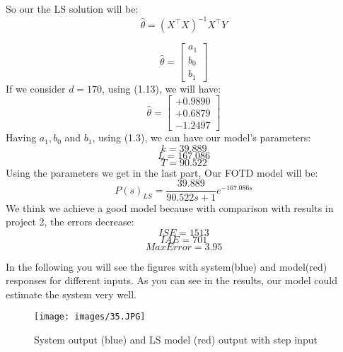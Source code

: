\documentclass[11pt]{scrartcl} %
\begin{document}
So our the LS solution will be:
\begin{equation}\hat{\theta}=\left(X^{\top} X\right)^{-1} X^{\top} Y\end{equation}


\begin{equation}
\hat{\theta}=\left[\begin{array}{l}
a_{1} \\
b_{0} \\
b_{1}
\end{array}\right]
\end{equation}
If we consider $d = 170$, using (1.13), we will have:
\begin{equation}
\hat{\theta}=\left[\begin{array}{l}
+0.9890 \\
+0.6879 \\
-1.2497
\end{array}\right]
\end{equation}
Having $a_1, b_0$ and $b_1$, using (1.3), we can have our model's parameters:
\begin{equation}k=39.889\end{equation}
\begin{equation}L=167.086\end{equation}
\begin{equation}T=90.522\end{equation}
Using the parameters we get in the last part, Our FOTD model will be:
\begin{equation}P(s)_{LS}=\frac{39.889}{90.522 s+1} e^{-167.086 s}\end{equation}
We think we achieve a good model because with comparison with results in project 2, the errors decrease:
\begin{equation}ISE=1513\end{equation}
\begin{equation}IAE=701\end{equation}
\begin{equation}MaxError=3.95\end{equation}

In the following you will see the figures with system(blue) and model(red) responses for different inputs. As you can see in the results, our model could estimate the system very well.
\begin{figure}[H]
	\centering
	\texttt{[image: images/35.JPG]}
	\caption{System output (blue) and LS model (red) output with step input}
\end{figure}\\
\end{document}
